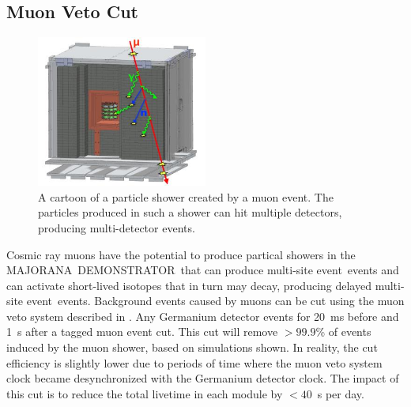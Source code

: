 \documentclass[notitlepage,rmp,aps,10pt]{revtex4-1}
\newcommand{\MJ}{M{\footnotesize AJORANA}}
\newcommand{\Demo}{D{\footnotesize EMON\-STRAT\-OR}}
\newcommand{\MJD}{\MJ\ \Demo}
\newcommand{\msmd}{multi-site event}
\begin{document}
\subsection{Muon Veto Cut}
\begin{figure}[h]
  \centering
  \includegraphics[width=0.5\textwidth]{muonevent}
  \caption[Example muon event]{\label{fig:muonevent}
    A cartoon of a particle shower created by a muon event. The particles produced in such a shower can hit multiple detectors, producing multi-detector events.
  }
\end{figure}
Cosmic ray muons have the potential to produce partical showers in the \MJD\ that can produce \msmd\ events and can activate short-lived isotopes that in turn may decay, producing delayed \msmd\ events.
Background events caused by muons can be cut using the muon veto system described in \cite{2015wiseman}.
Any Germanium detector events for 20~ms before and 1~s after a tagged muon event cut.
This cut will remove $>99.9$\% of events induced by the muon shower, based on simulations shown.
In reality, the cut efficiency is slightly lower due to periods of time where the muon veto system clock became desynchronized with the Germanium detector clock.
The impact of this cut is to reduce the total livetime in each module by $<40$~s per day.
\\
\end{document}
